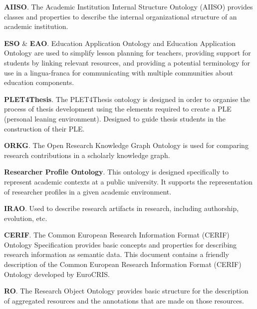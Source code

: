 \medskip
\noindent \textbf{AIISO}. \cite{DBLP:conf/incos/KalemiM11} The Academic Institution Internal Structure Ontology (AIISO) provides classes and properties to describe the internal organizational structure of an academic institution.

\medskip
\noindent \textbf{ESO} \& \textbf{EAO}. \cite{DBLP:conf/semweb/RashidM18} Education Application Ontology and Education Application Ontology are used to simplify lesson planning for teachers, providing support for students by linking relevant resources, and providing a potential terminology for use in a lingua-franca for communicating with multiple communities about education components.

\medskip
\noindent \textbf{PLET4Thesis}. \cite{DBLP:conf/icetc/Tapia-LeonSCL17} The PLET4Thesis ontology is designed in order to organise the process of thesis development using the elements required to create a PLE (personal leaning environment).  Designed to guide thesis students in the construction of their PLE.

\medskip
\noindent \textbf{ORKG}. \cite{DBLP:conf/kcap/OelenJFSA19} The Open Research Knowledge Graph Ontology is used for comparing research contributions in a scholarly knowledge graph.

\medskip
\noindent \textbf{Researcher Profile Ontology}. \cite{DBLP:conf/cvc/BravoRC19} This ontology is designed specifically to represent academic contexts at a public university. It supports the representation of researcher profiles in a given academic environment.

\medskip
\noindent \textbf{IRAO}. Used to describe research artifacts in research, including authorship, evolution, etc.

\medskip
\noindent \textbf{CERIF}. \cite{DBLP:journals/procedia/JorgLK12} The Common European Research Information Format (CERIF) Ontology Specification provides basic concepts and properties for describing research information as semantic data. This document contains a friendly description of the Common European Research Information Format (CERIF) Ontology developed by EuroCRIS.

\medskip
\noindent \textbf{RO}. \cite{DBLP:journals/ws/Belhajjame0GGHP15} The Research Object Ontology provides basic structure for the description of aggregated resources and the annotations that are made on those resources.





